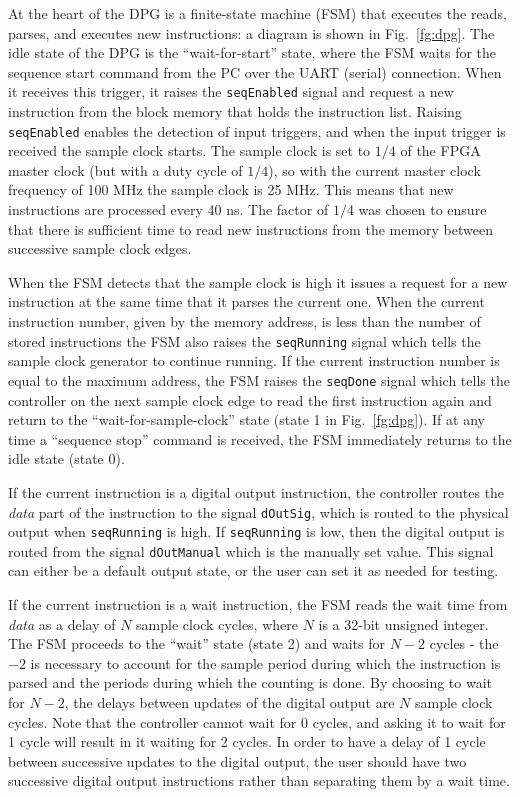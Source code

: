 \documentclass[]{article}
\begin{document}
At the heart of the DPG is a finite-state machine (FSM) that executes the reads, parses, and executes new instructions: a diagram is shown in Fig.~\ref{fg:dpg}.  The idle state of the DPG is the ``wait-for-start'' state, where the FSM waits for the sequence start command from the PC over the UART (serial) connection.  When it receives this trigger, it raises the \verb|seqEnabled| signal and request a new instruction from the block memory that holds the instruction list.  Raising \verb|seqEnabled| enables the detection of input triggers, and when the input trigger is received the sample clock starts.  The sample clock is set to $1/4$ of the FPGA master clock (but with a duty cycle of $1/4$), so with the current master clock frequency of 100 MHz the sample clock is 25 MHz.  This means that new instructions are processed every 40 ns.  The factor of $1/4$ was chosen to ensure that there is sufficient time to read new instructions from the memory between successive sample clock edges.

When the FSM detects that the sample clock is high it issues a request for a new instruction at the same time that it parses the current one.  When the current instruction number, given by the memory address, is less than the number of stored instructions the FSM also raises the \verb|seqRunning| signal which tells the sample clock generator to continue running.  If the current instruction number is equal to the maximum address, the FSM raises the \verb|seqDone| signal which tells the controller on the next sample clock edge to read the first instruction again and return to the ``wait-for-sample-clock'' state (state 1 in Fig.~\ref{fg:dpg}).  If at any time a ``sequence stop'' command is received, the FSM immediately returns to the idle state (state 0).

If the current instruction is a digital output instruction, the controller routes the \emph{data} part of the instruction to the signal \verb|dOutSig|, which is routed to the physical output when \verb|seqRunning| is high.  If \verb|seqRunning| is low, then the digital output is routed from the signal \verb|dOutManual| which is the manually set value.  This signal can either be a default output state, or the user can set it as needed for testing.  

If the current instruction is a wait instruction, the FSM reads the wait time from \emph{data} as a delay of $N$ sample clock cycles, where $N$ is a 32-bit unsigned integer.  The FSM proceeds to the ``wait'' state (state 2) and waits for $N-2$ cycles - the $-2$ is necessary to account for the sample period during which the instruction is parsed and the periods during which the counting is done.  By choosing to wait for $N-2$, the delays between updates of the digital output are $N$ sample clock cycles.  Note that the controller cannot wait for 0 cycles, and asking it to wait for 1 cycle will result in it waiting for 2 cycles.  In order to have a delay of 1 cycle between successive updates to the digital output, the user should have two successive digital output instructions rather than separating them by a wait time.
\end{document}
